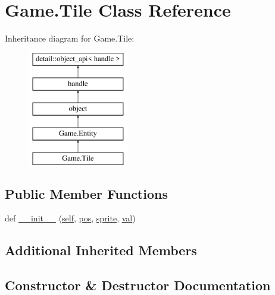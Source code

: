 \hypertarget{class_game_1_1_tile}{}\section{Game.\+Tile Class Reference}
\label{class_game_1_1_tile}
Inheritance diagram for Game.\+Tile\+:\begin{figure}[H]
\begin{center}
\leavevmode
\includegraphics[height=5.000000cm]{class_game_1_1_tile}
\end{center}
\end{figure}
\subsection*{Public Member Functions}
\begin{DoxyCompactItemize}
\item 
def \mbox{\hyperlink{class_game_1_1_tile_a76fe330c3341ef440fae834f21966f04}{\+\_\+\+\_\+init\+\_\+\+\_\+}} (\mbox{\hyperlink{modsupport_8h_a0180ca1808366e5da641475e8bf8cca3}{self}}, \mbox{\hyperlink{class_game_1_1_entity_a982b731c21081324b5809d7a88781b43}{pos}}, \mbox{\hyperlink{class_game_1_1_entity_ac8064353c61c836135c530e8fc77842b}{sprite}}, \mbox{\hyperlink{_s_d_l__opengl__glext_8h_a26942fd2ed566ef553eae82d2c109c8f}{val}})
\end{DoxyCompactItemize}
\subsection*{Additional Inherited Members}


\subsection{Constructor \& Destructor Documentation}
\mbox{\label{class_game_1_1_tile_a76fe330c3341ef440fae834f21966f04}} 
